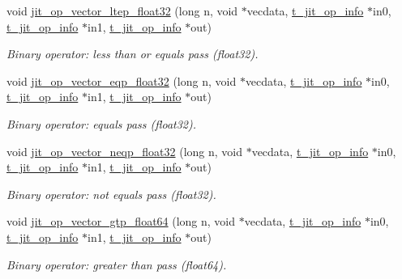 \begin{DoxyCompactItemize}
void \hyperlink{group__opvecmod_ga39ea14122ac8e782d5065144e71be3aa}{jit\_\-op\_\-vector\_\-ltep\_\-float32} (long n, void $\ast$vecdata, \hyperlink{structt__jit__op__info}{t\_\-jit\_\-op\_\-info} $\ast$in0, \hyperlink{structt__jit__op__info}{t\_\-jit\_\-op\_\-info} $\ast$in1, \hyperlink{structt__jit__op__info}{t\_\-jit\_\-op\_\-info} $\ast$out)
\begin{DoxyCompactList}\small\item\em Binary operator: less than or equals pass (float32). \item\end{DoxyCompactList}\item 
void \hyperlink{group__opvecmod_ga9b5e0c3167af07d96829bde185ccb1de}{jit\_\-op\_\-vector\_\-eqp\_\-float32} (long n, void $\ast$vecdata, \hyperlink{structt__jit__op__info}{t\_\-jit\_\-op\_\-info} $\ast$in0, \hyperlink{structt__jit__op__info}{t\_\-jit\_\-op\_\-info} $\ast$in1, \hyperlink{structt__jit__op__info}{t\_\-jit\_\-op\_\-info} $\ast$out)
\begin{DoxyCompactList}\small\item\em Binary operator: equals pass (float32). \item\end{DoxyCompactList}\item 
void \hyperlink{group__opvecmod_ga047be97619e283805d362677cf79c21a}{jit\_\-op\_\-vector\_\-neqp\_\-float32} (long n, void $\ast$vecdata, \hyperlink{structt__jit__op__info}{t\_\-jit\_\-op\_\-info} $\ast$in0, \hyperlink{structt__jit__op__info}{t\_\-jit\_\-op\_\-info} $\ast$in1, \hyperlink{structt__jit__op__info}{t\_\-jit\_\-op\_\-info} $\ast$out)
\begin{DoxyCompactList}\small\item\em Binary operator: not equals pass (float32). \item\end{DoxyCompactList}\item 
void \hyperlink{group__opvecmod_gaed256cbf4fea6f3cab14d0cf849e4f79}{jit\_\-op\_\-vector\_\-gtp\_\-float64} (long n, void $\ast$vecdata, \hyperlink{structt__jit__op__info}{t\_\-jit\_\-op\_\-info} $\ast$in0, \hyperlink{structt__jit__op__info}{t\_\-jit\_\-op\_\-info} $\ast$in1, \hyperlink{structt__jit__op__info}{t\_\-jit\_\-op\_\-info} $\ast$out)
\begin{DoxyCompactList}\small\item\em Binary operator: greater than pass (float64). \item\end{DoxyCompactList}\item 

\end{DoxyCompactItemize}

